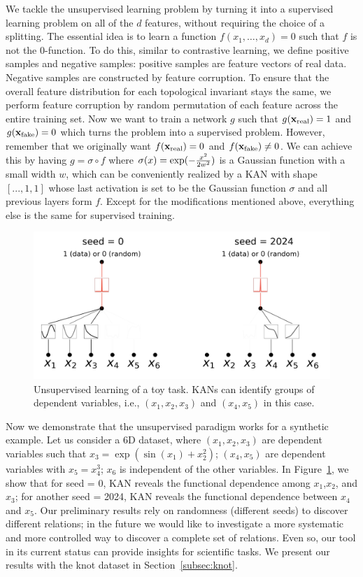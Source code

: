 \documentclass{article}
\numberwithin{equation}{section}
\numberwithin{figure}{section}
\newcommand{\mat}[1]{\mathbf{#1}}
\begin{document}
We tackle the unsupervised learning problem by turning it into a supervised learning problem on all of the $d$ features, without requiring the choice of a splitting. The essential idea is to learn a function $f(x_1,\dots,x_d)=0$ such that $f$ is not the $0$-function.  To do this, similar to contrastive learning, we define positive samples and negative samples: positive samples are feature vectors of real data. Negative samples are constructed by feature corruption. To ensure that the overall feature distribution for each topological invariant stays the same, we perform feature corruption by random permutation of each feature across the entire training set. Now we want to train a network $g$ such that $g(\mat{x}_{\rm real})=1$ and $g(\mat{x}_{\rm fake})=0$ which turns the problem into a supervised problem. However, remember that we originally want $f(\mat{x}_{\rm real})=0$ and $f(\mat{x}_{\rm fake})\neq 0$. We can achieve this by having $g=\sigma\circ f$ where $\sigma(x)={\rm exp}(-\frac{x^2}{2w^2})$ is a Gaussian function with a small width $w$, which can be conveniently realized by a KAN with shape $[..., 1, 1]$ whose last activation is set to be the Gaussian function $\sigma$ and all previous layers form $f$. Except for the modifications mentioned above, everything else is the same for supervised training.

\begin{figure}[t]
    \centering
    \includegraphics[width=0.6\linewidth]{figs/unsupervised_toy.png}
    \caption{Unsupervised learning of a toy task. KANs can identify groups of dependent variables, i.e., $(x_1,x_2,x_3)$ and $(x_4,x_5)$ in this case.}
    \label{fig:unsupervised-toy}
\end{figure}

Now we demonstrate that the unsupervised paradigm works for a synthetic example. Let us consider a 6D dataset, where $(x_1,x_2,x_3)$ are dependent variables such that $x_3=\exp(\sin(x_1)+x_2^2)$; $(x_4,x_5)$ are dependent variables with $x_5=x_4^3$; $x_6$ is independent of the other variables. In Figure~\ref{fig:unsupervised-toy}, we show that for seed = 0, KAN reveals the functional dependence among $x_1$,$x_2$, and $x_3$; for another seed = 2024, KAN reveals the functional dependence between $x_4$ and $x_5$. Our preliminary results rely on randomness (different seeds) to discover different relations; in the future we would like to investigate a more systematic and more controlled way to discover a complete set of relations. Even so, our tool in its current status can provide insights for scientific tasks. We present our results with the knot dataset in Section~\ref{subsec:knot}. 
\end{document}
